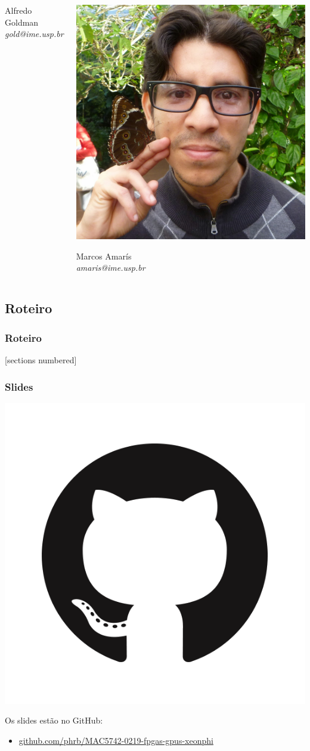 \documentclass[10pt, compress]{beamer}
\begin{document}
\begin{frame}
\begin{columns}[T,onlytextwidth]
\begin{center}
            Alfredo Goldman \\
            \emph{\alert{gold}@ime.usp.br} \\
        \end{center}

        \begin{center}
            \includegraphics[width=.75\textwidth]{marcos}

            Marcos Amarís \\
            \emph{\alert{amaris}@ime.usp.br} \\
        \end{center}
    \end{columns}
\end{frame}

\subsection*{Roteiro}

\begin{frame}
    \frametitle{Roteiro}
    [sections numbered]
    \tableofcontents
\end{frame}

\begin{frame}
    \frametitle{Slides}
    \begin{center}
        \includegraphics[width=.18\textwidth]{github}
    \end{center}
    Os slides estão no \alert{GitHub}:

    \begin{itemize}
        \item \url{github.com/phrb/MAC5742-0219-fpgas-gpus-xeonphi}
    \end{itemize}
\end{frame}
\end{document}

